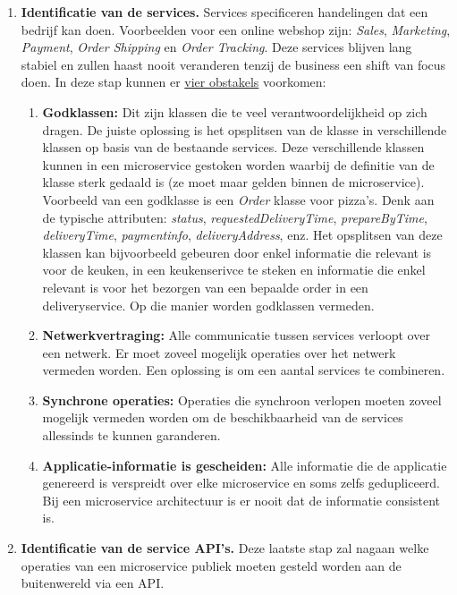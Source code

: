 \begin{enumerate}
		\item\textbf{Identificatie van de services.} Services specificeren handelingen dat een bedrijf kan doen. Voorbeelden voor een online webshop zijn: \textit{Sales}, \textit{Marketing}, \textit{Payment}, \textit{Order Shipping} en \textit{Order Tracking}. Deze services blijven lang stabiel en zullen haast nooit veranderen tenzij de business een shift van focus doen. In deze stap kunnen er \uline{vier obstakels} voorkomen:
		\begin{enumerate}
			\item \textbf{Godklassen:} Dit zijn klassen die te veel verantwoordelijkheid op zich dragen. De juiste oplossing is het opsplitsen van de klasse in verschillende klassen op basis van de bestaande services. Deze verschillende klassen kunnen in een microservice gestoken worden waarbij de definitie van de klasse sterk gedaald is (ze moet maar gelden binnen de microservice). Voorbeeld van een godklasse is een \emph{Order} klasse voor pizza's. Denk aan de typische attributen: \textit{status}, \textit{requestedDeliveryTime}, \textit{prepareByTime}, \textit{deliveryTime}, \textit{paymentinfo}, \textit{deliveryAddress}, enz. Het opsplitsen van deze klassen kan bijvoorbeeld gebeuren door enkel informatie die relevant is voor de keuken, in een keukenserivce te steken en informatie die enkel relevant is voor het bezorgen van een bepaalde order in een deliveryservice. Op die manier worden godklassen vermeden.
			\item \textbf{Netwerkvertraging:} Alle communicatie tussen services verloopt over een netwerk. Er moet zoveel mogelijk operaties over het netwerk vermeden worden. Een oplossing is om een aantal services te combineren.
			\item \textbf{Synchrone operaties:} Operaties die synchroon verlopen moeten zoveel mogelijk vermeden worden om de beschikbaarheid van de services allessinds te kunnen garanderen. 
			\item \textbf{Applicatie-informatie is gescheiden:} Alle informatie die de applicatie genereerd is verspreidt over elke microservice en soms zelfs gedupliceerd. Bij een microservice architectuur is er nooit dat de informatie consistent is. 
		\end{enumerate}

		\item\textbf{Identificatie van de service API's.} Deze laatste stap zal nagaan welke operaties van een microservice publiek moeten gesteld worden aan de buitenwereld via een API. 
	\end{enumerate}
